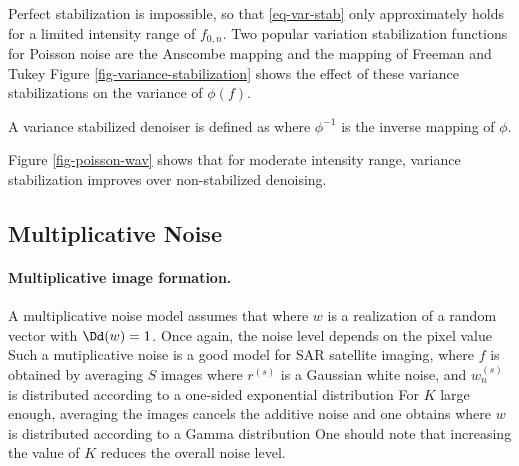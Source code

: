 Perfect stabilization is impossible, so that \eqref{eq-var-stab} only approximately holds for a limited intensity range of $f_{0,n}$.
Two popular variation stabilization functions for Poisson noise are the Anscombe mapping
and the mapping of Freeman and Tukey 
Figure \ref{fig-variance-stabilization} shows the effect of these variance stabilizations on the variance of $\phi(f)$.


A variance stabilized denoiser is defined as
where $\phi^{-1}$ is the inverse mapping of $\phi$.

Figure \ref{fig-poisson-wav} shows that for moderate intensity range, variance stabilization improves over non-stabilized denoising.


\subsection{Multiplicative Noise}

\paragraph{Multiplicative image formation.}

A multiplicative noise model assumes that
where $w$ is a realization of a random vector with  $\Dd(w)=1$.
Once again, the noise level depends on the pixel value
Such a mutiplicative noise is a good model for SAR satellite imaging, where $f$ is obtained by averaging $S$ images
where $r^{(s)}$ is a Gaussian white noise, and $w^{(s)}_n$ is distributed according to a one-sided exponential distribution
For $K$ large enough, averaging the images cancels the additive noise and one obtains
where $w$ is distributed according to a Gamma distribution 
One should note that increasing the value of $K$ reduces the overall noise level.

